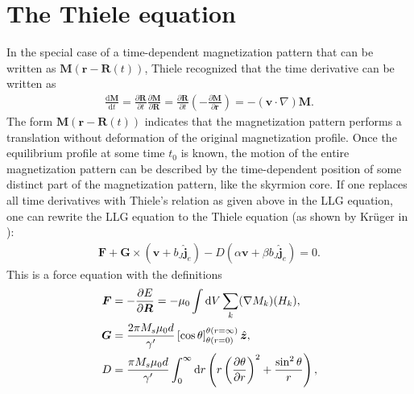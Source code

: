 \section{The Thiele equation}
In the special case of a time-dependent magnetization pattern that can be written as $\mathbold{M}(\mathbold{r}-\mathbold{R}(t))$, Thiele recognized \cite{Thiele1973} that the time derivative can be written as 
\begin{align}
\label{eq:ThieleRelation}
\frac{\textrm{d} \mathbold{M}}{\textrm{d} t} = \frac{\partial \mathbold{R}}{\partial t}\frac{\partial \mathbold{M}}{\partial \mathbold{R}} = \frac{\partial \mathbold{R}}{\partial t} (-\frac{\partial \mathbold{M}}{\partial \mathbold{r}}) = -(\mathbold{v}\cdot\nabla)\mathbold{M}.
\end{align}
The form $\mathbold{M}(\mathbold{r}-\mathbold{R}(t))$ indicates that the magnetization pattern performs a translation without deformation of the original magnetization profile. Once the equilibrium profile at some time $t_0$ is known, the motion of the entire magnetization pattern can be described by the time-dependent position of some distinct part of the magnetization pattern, like the skyrmion core. If one replaces all time derivatives with Thiele's relation as given above in the LLG equation, one can rewrite the LLG equation to the Thiele equation (as shown by Kr\"{u}ger in \cite{krugerDissertation}):
\begin{align}
\label{eq:Thiele}
\mathbold{F} + \mathbold{G}\times(\mathbold{v}+b_J\mathbold{\hat{j}}_e) - D(\alpha\mathbold{v}+\beta b_J\mathbold{\hat{j}}_e) = 0.
\end{align}
This is a force equation with the definitions
\begin{subequations}
\label{eq:ThieleFGD}
\begin{align}
\label{eq:ThieleF}
\mathbold{F} &= -\frac{\partial E}{\partial \mathbold{R}} = -\mu_0\int \d V\sum_k (\mathbold{\nabla}M_k)(H_k), \\
\label{eq:ThieleG}
\mathbold{G} &= \frac{2\pi M_s\mu_0 d}{\gamma'}\left[\cos\theta\right]_{\theta(r=0)}^{\theta(r=\infty)} \mathbold{\hat{z}},\\
\label{eq:ThieleD}
D &= \frac{\pi M_s \mu_0 d}{\gamma '} \int_0^{\infty} \d r \left(r\left(\frac{\partial \theta}{\partial r}\right)^2+\frac{\sin^2\theta}{r}\right),
\end{align}
\end{subequations}
